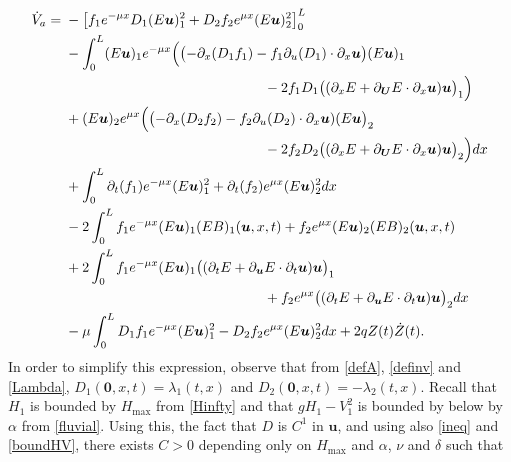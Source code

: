 \documentclass[JEP,XML,SOM,Unicode]{cedram}
\theoremstyle{definition}
\begin{document}
\begin{align}
\label{diffVa2}
\dot V_{a}={}& -\left[f_{1}e^{-\mu x}D_{1}(E\boldsymbol{u})_{1}^{2}+D_{2}f_{2}e^{\mu x}(E\boldsymbol{u})_{2}^{2}\right]_{0}^{L}\\ \notag
&-\int_{0}^{L}(E\boldsymbol{u})_{1}e^{-\mu x}\Bigl(\bigl(-\partial_{x}(D_{1}f_{1})-f_{1}\partial_{u}(D_{1})\cdot\partial_{x}\boldsymbol{u} \bigr)(E\boldsymbol{u})_{1}\\ \notag
&\hspace*{5cm}-2f_{1}D_{1} \bigl((\partial_{x}E+\partial_{\boldsymbol{U}}E\cdot\partial_{x}\boldsymbol{u})\boldsymbol{u} \bigl)_{1}\Bigr)\\ \notag
&+(E\boldsymbol{u})_{2}e^{\mu x}\Bigl(\bigl(-\partial_{x}(D_{2}f_{2})-f_{2}\partial_{u}(D_{2})\cdot\partial_{x}\boldsymbol{u})(E\boldsymbol{u} \bigr)_{2}\\ \notag
&\hspace*{5cm}-2f_{2}D_{2} \bigl((\partial_{x}E+\partial_{\boldsymbol{U}}E\cdot\partial_{x}\boldsymbol{u})\boldsymbol{u} \bigr)_{2}\Bigr)dx\\ \notag
&+\int_{0}^{L}\partial_{t}(f_{1})e^{-\mu x}(E\boldsymbol{u})_{1}^{2}+\partial_{t}(f_{2})e^{\mu x}(E\boldsymbol{u})_{2}^{2}dx\\ \notag
&-2\int_{0}^{L}f_{1}e^{-\mu x}(E\boldsymbol{u})_{1}(EB)_{1}(\boldsymbol{u},x,t)+f_{2}e^{\mu x}(E\boldsymbol{u})_{2}(EB)_{2}(\boldsymbol{u},x,t)\\ \notag
&+2\int_{0}^{L}f_{1}e^{-\mu x}(E\boldsymbol{u})_{1} \bigl((\partial_{t}E+\partial_{\boldsymbol{u}}E\cdot\partial_{t}\boldsymbol{u})\boldsymbol{u} \bigr)_{1}\\ \notag
&\hspace*{5cm}+f_{2}e^{\mu x} \bigl((\partial_{t}E+\partial_{\boldsymbol{u}}E\cdot\partial_{t}\boldsymbol{u})\boldsymbol{u} \bigr)_{2}dx\\ \notag
&-\mu\int_{0}^{L}D_{1}f_{1}e^{-\mu x}(E\boldsymbol{u})_{1}^{2}-D_{2}f_{2}e^{\mu x}(E\boldsymbol{u})_{2}^{2}dx
+2qZ(t)\dot Z(t).
\end{align}
In order to simplify this expression, observe that from \eqref{defA}, \eqref{definv} and \eqref{Lambda}, $D_{1}(\boldsymbol{0},x,t)=\lambda_{1}(t,x)$ and $D_{2}(\boldsymbol{0},x,t)=-\lambda_{2}(t,x)$. Recall that $H_{1}$ is bounded by $H_{\max}$ from \eqref{Hinfty} and that $gH_{1}-V_{1}^{2}$ is bounded by below by $\alpha$ from \eqref{fluvial}. Using this, the fact that
$D$ is $C^{1}$ in $\boldsymbol{u}$,
and using also \eqref{ineq} and \eqref{boundHV}, there exists $C>0$ depending only on $H_{\max}$ and $\alpha$, $\nu$ and $\delta$ such that
\end{document}
